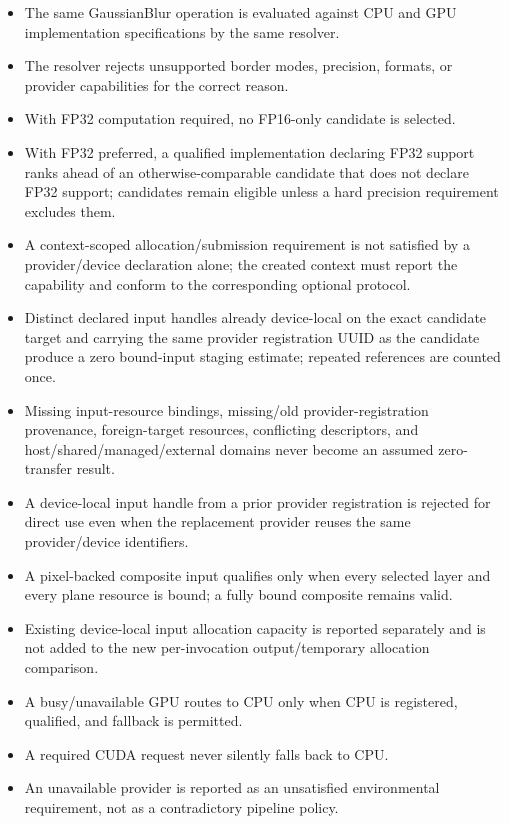\exitcriteria
\begin{itemize}
  \item The same GaussianBlur operation is evaluated against CPU and GPU implementation specifications by the same resolver.
  \item The resolver rejects unsupported border modes, precision, formats, or provider capabilities for the correct reason.
  \item With FP32 computation required, no FP16-only candidate is selected.
  \item With FP32 preferred, a qualified implementation declaring FP32 support ranks ahead of an otherwise-comparable candidate that does not declare FP32 support; candidates remain eligible unless a hard precision requirement excludes them.
  \item A context-scoped allocation/submission requirement is not satisfied by a provider/device declaration alone; the created context must report the capability and conform to the corresponding optional protocol.
  \item Distinct declared input handles already device-local on the exact candidate target and carrying the same provider registration UUID as the candidate produce a zero bound-input staging estimate; repeated references are counted once.
  \item Missing input-resource bindings, missing/old provider-registration provenance, foreign-target resources, conflicting descriptors, and host/shared/managed/external domains never become an assumed zero-transfer result.
  \item A device-local input handle from a prior provider registration is rejected for direct use even when the replacement provider reuses the same provider/device identifiers.
  \item A pixel-backed composite input qualifies only when every selected layer and every plane resource is bound; a fully bound composite remains valid.
  \item Existing device-local input allocation capacity is reported separately and is not added to the new per-invocation output/temporary allocation comparison.
  \item A busy/unavailable GPU routes to CPU only when CPU is registered, qualified, and fallback is permitted.
  \item A required CUDA request never silently falls back to CPU.
  \item An unavailable provider is reported as an unsatisfied environmental requirement, not as a contradictory pipeline policy.
\end{itemize}

